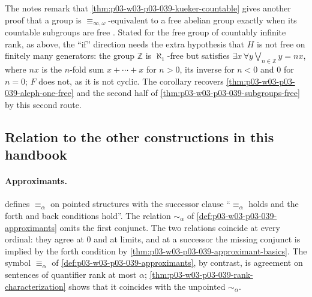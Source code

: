 The notes remark that \cref{thm:p03-w03-p03-039-kueker-countable} gives
another proof that a group is \(\equiv_{\infty,\omega}\)-equivalent to a
free abelian group exactly when its countable subgroups are free
\cite[p.~26]{Marker2014InfinitaryNotes}. Stated for the free group of
countably infinite rank, as above, the ``if'' direction needs the extra
hypothesis that \(H\) is not free on finitely many generators: the group
\(\mathbb Z\) is \(\aleph_1\)-free but satisfies
\(\exists x\,\forall y\bigvee_{n\in\mathbb Z}y=nx\), where \(nx\) is the
\(n\)-fold sum \(x+\cdots+x\) for \(n>0\), its inverse for \(n<0\) and \(0\)
for \(n=0\); \(F\) does not, as it is not cyclic.
The corollary recovers \cref{thm:p03-w03-p03-039-aleph-one-free} and the
second half of \cref{thm:p03-w03-p03-039-subgroups-free} by this second
route.

\subsection{Relation to the other constructions in this handbook}
\label{sec:p03-w03-p03-039-bridge}

\paragraph{Approximants.}  defines
\(\equiv_\alpha\) on pointed structures with the successor clause ``\(\equiv_\alpha\)
holds and the forth and back conditions hold''. The relation
\(\sim_\alpha\) of \cref{def:p03-w03-p03-039-approximants} omits the first
conjunct. The two relations coincide at every ordinal: they agree at
\(0\) and at limits, and at a successor the missing conjunct is implied by
the forth condition by \cref{thm:p03-w03-p03-039-approximant-basics}. The
symbol \(\equiv_\alpha\) of \cref{def:p03-w03-p03-039-approximants}, by
contrast, is agreement on sentences of quantifier rank at most \(\alpha\);
\cref{thm:p03-w03-p03-039-rank-characterization} shows that it coincides with
the unpointed \(\sim_\alpha\).

